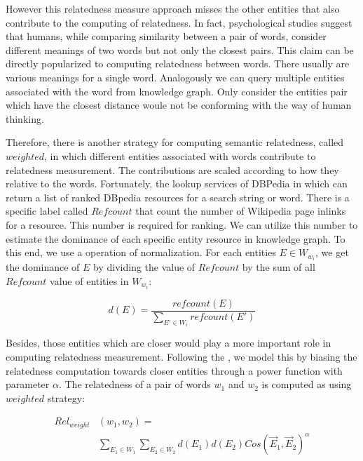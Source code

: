 However this relatedness measure approach misses the other entities that also contribute to the computing of relatedness.
In fact, psychological studies suggest that humans, while comparing similarity between a pair of words, consider
different meanings of two words but not only the closest pairs\cite{Tversky77}. This claim can be directly popularized to computing
relatedness between words. There usually are various meanings for a single word. Analogously we can query multiple
entities associated with the word from knowledge graph. Only consider the entities pair which have the closest distance
woule not be conforming with the way of human thinking.

Therefore, there is another strategy for computing semantic relatedness, called $weighted$, in which
different entities associated with words contribute to relatedness measurement. The contributions are
scaled according to how they relative to the words. Fortunately, the lookup services of DBPedia in which can
return a list of ranked DBpedia resources for a search string or word. There is a specific label called
$Refcount$ that count the number of Wikipedia page inlinks for a resource. This number is required for ranking.
We can utilize this number to estimate the dominance of each specific entity resource in knowledge graph.
To this end, we use a operation of normalization. For each entities $E \in W_{w_i}$, we get the dominance of
$E$ by dividing the value of $Refcount$ by the sum of all $Refcount$ value of entities in  $W_{w_i}$:

\begin{small}
    \begin{equation}
        \label{cos}
        \nonumber
        d(E) = \frac{refcount(E)}{\sum_{{E}'\in W_i} refcount({E}')}
    \end{equation}
\end{small}

Besides, those entities which are closer would play a more important role in computing relatedness measurement.
Following the \cite{acl/IacobacciPN15}, we model this by biasing the relatedness computation towards closer entities through a power function with
parameter $\alpha$. The relatedness of a pair of words $w_1$ and $w_2$ is computed as using $weighted$ strategy:

\begin{small}
    \begin{equation}
        \begin{split}
        \label{cos}
        \nonumber
        Rel_{weight}&(w_1, w_2)=\\ 
        &\sum_{E_1 \in W_1}\sum_{E_2 \in W_2}d(E_1)d(E_2)Cos(\overrightarrow E_1,\overrightarrow E_2)^\alpha 
        \end{split}
    \end{equation}
\end{small}

